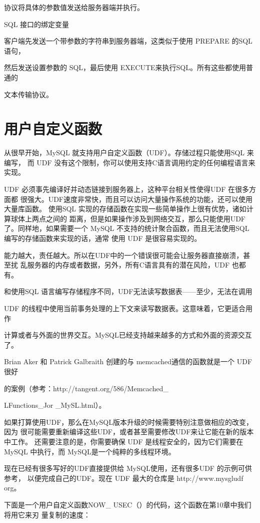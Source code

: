 协议将具体的参数值发送给服务器端并执行。

SQL 接口的绑定变量

客户端先发送一个带参数的字符串到服务器端，这类似于使用 PREPARE 的SQL 语句，

然后发送设置参数的 SQL，最后使用 EXECUTE来执行SQL。所有这些都使用普通的

文本传输协议。

\section{用户自定义函数}
从很早开始，MySQL 就支持用户自定义函数（UDF）。存储过程只能使用SQL 来编写，
而 UDF 没有这个限制，你可以使用支持C语言调用约定的任何编程语言来实现。

UDF 必须事先编译好并动态链接到服务器上，这种平台相关性使得UDF 在很多方面都
很强大。UDF速度非常快，而且可以访问大量操作系统的功能，还可以使用大量库函数。
使用SQL 实现的存储函数在实现一些简单操作上很有优势，诸如计算球体上两点之间的
距离，但是如果操作涉及到网络交互，那么只能使用UDF 了。同样地，如果需要一个
MySQL 不支持的统计聚合函数，而且无法使用SQL编写的存储函数来实现的话，通常
使用 UDF 是很容易实现的。

能力越大，责任越大。所以在UDF中的一个错误很可能会让服务器直接崩溃，甚至扰
乱服务器的内存或者数据，另外，所有C语言具有的潜在风险，UDF 也都有。

和使用SQL 语言编写存储程序不同，UDF无法读写数据表——至少，无法在调用

UDF 的线程中使用当前事务处理的上下文来读写数据表。这意味着，它更适合用作

计算或者与外面的世界交互。MySQL已经支持越来越多的方式和外面的资源交互了。

Brian Aker 和 Patrick Galbraith 创建的与 memcached通信的函数就是一个 UDF 很好

的案例（参考：http://tangent.org/586/Memcached\_

LFunctions\_Jor \_MySL.html）。

如果打算使用UDF，那么在MySQL版本升级的时候需要特别注意做相应的改变，因为
很可能需要重新编译这些UDF，或者甚至需要修改UDF来让它能在新的版本中工作。
还需要注意的是，你需要确保 UDF 是线程安全的，因为它们需要在MySQL 中执行，而
MySQL是一个纯粹的多线程环境。

现在已经有很多写好的UDF直接提供给 MySQL使用，还有很多UDF 的示例可供参考，
以便完成自己的UDF。现在 UDF 最大的仓库是 http://www.mysgludf org。

下面是一个用户自定义函数NOW\_ USEC（）的代码，这个函数在第10章中我们将用它来刃
量复制的速度：

